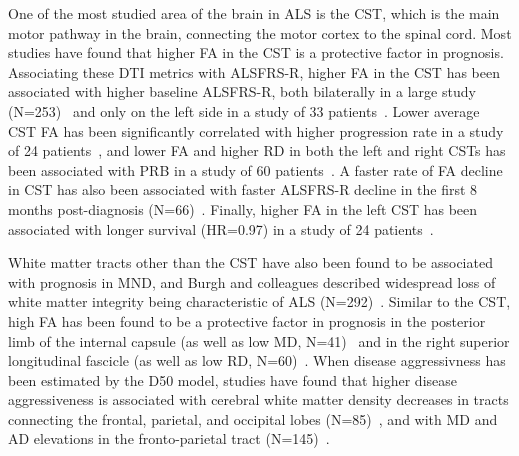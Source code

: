 One of the most studied area of the brain in ALS is the CST, which is the main motor pathway in the brain, connecting the motor cortex to the spinal cord.
Most studies have found that higher FA in the CST is a protective factor in prognosis.
Associating these DTI metrics with ALSFRS-R, higher FA in the CST has been associated with higher baseline ALSFRS-R, both bilaterally in a large study (N=253)~\cite{mullerLargescaleMulticentreCerebral2016} and only on the left side in a study of 33 patients~\cite{liBrainstemInvolvementAmyotrophic2021}.
Lower average CST FA has been significantly correlated with higher progression rate in a study of 24 patients~\cite{agostaMRIPredictorsLongterm2010}, and lower FA and higher RD in both the left and right CSTs has been associated with PRB in a study of 60 patients~\cite{menkeWidespreadGreyMatter2014}.
A faster rate of FA decline in CST has also been associated with faster ALSFRS-R decline in the first 8 months post-diagnosis (N=66)~\cite{kalraProspectiveHarmonizedMulticenter2020}.
Finally, higher FA in the left CST has been associated with longer survival (HR=0.97) in a study of 24 patients~\cite{agostaMRIPredictorsLongterm2010}.

White matter tracts other than the CST have also been found to be associated with prognosis in MND, and Burgh and colleagues described widespread loss of white matter integrity being characteristic of ALS (N=292)~\cite{burghMultimodalLongitudinalStudy2020}.
Similar to the CST, high FA has been found to be a protective factor in prognosis in the posterior limb of the internal capsule (as well as low MD, N=41)~\cite{grolezMRICervicalSpinal2018} and in the right superior longitudinal fascicle (as well as low RD, N=60)~\cite{menkeWidespreadGreyMatter2014}.
When disease aggressivness has been estimated by the D50 model, studies have found that higher disease aggressiveness is associated with cerebral white matter density decreases in tracts connecting the frontal, parietal, and occipital lobes (N=85)~\cite{steinbachApplyingD50Disease2020}, and with MD and AD elevations in the fronto-parietal tract (N=145)~\cite{steinbachDiseaseAggressivenessSignatures2021}.

